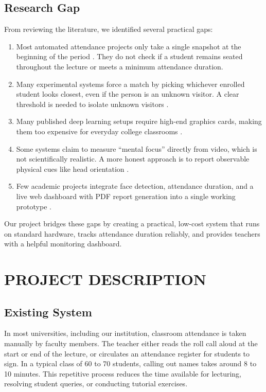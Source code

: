 \documentclass[10pt]{report}
\begin{document}
\section{Research Gap}
\hspace{0.5cm}From reviewing the literature, we identified several practical gaps:
\begin{enumerate}
    \item Most automated attendance projects only take a single snapshot at the beginning of the period \cite{chintalapati2013automated, raj2024facial}. They do not check if a student remains seated throughout the lecture or meets a minimum attendance duration.
    \item Many experimental systems force a match by picking whichever enrolled student looks closest, even if the person is an unknown visitor. A clear threshold is needed to isolate unknown visitors \cite{george2024edgeface}.
    \item Many published deep learning setups require high-end graphics cards, making them too expensive for everyday college classrooms \cite{zhang2023realtime, george2024edgeface}.
    \item Some systems claim to measure ``mental focus'' directly from video, which is not scientifically realistic. A more honest approach is to report observable physical cues like head orientation \cite{booth2023engagement, dewan2019engagement}.
    \item Few academic projects integrate face detection, attendance duration, and a live web dashboard with PDF report generation into a single working prototype \cite{rajesh2023smart, ghodekar2023activeness}.
\end{enumerate}
\hspace{0.5cm}Our project bridges these gaps by creating a practical, low-cost system that runs on standard hardware, tracks attendance duration reliably, and provides teachers with a helpful monitoring dashboard.

\chapter{PROJECT DESCRIPTION}
\linespread{1.5}

\section{Existing System}
\hspace{0.5cm}In most universities, including our institution, classroom attendance is taken manually by faculty members. The teacher either reads the roll call aloud at the start or end of the lecture, or circulates an attendance register for students to sign. In a typical class of 60 to 70 students, calling out names takes around 8 to 10 minutes. This repetitive process reduces the time available for lecturing, resolving student queries, or conducting tutorial exercises.
\end{document}
